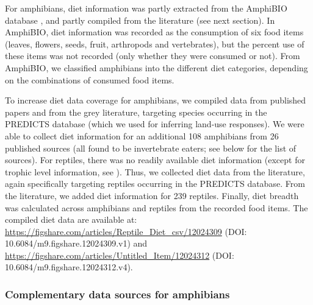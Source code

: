 \documentclass[11pt]{article}
\begin{document}
For amphibians, diet information was partly extracted from the AmphiBIO database \citep{Oliveira2017}, and partly compiled from the literature (see next section). In AmphiBIO, diet information was recorded as the consumption of six food items (leaves, flowers, seeds, fruit, arthropods and vertebrates), but the percent use of these items was not recorded (only whether they were consumed or not). From AmphiBIO, we classified amphibians into the different diet categories, depending on the combinations of consumed food items. 

To increase diet data coverage for amphibians, we compiled data from published papers and from the grey literature, targeting species occurring in the PREDICTS database (which we used for inferring land-use responses). We were able to collect diet information for an additional 108 amphibians from 26 published sources (all found to be invertebrate eaters; see below for the list of sources). For reptiles, there was no readily available diet information (except for trophic level information, see \citet{Etard2020}). Thus, we collected diet data from the literature, again specifically targeting reptiles occurring in the PREDICTS database. From the literature, we added diet information for 239 reptiles. Finally, diet breadth was calculated across amphibians and reptiles from the recorded food items. The compiled diet data are available at:
\url{https://figshare.com/articles/Reptile_Diet_csv/12024309} (DOI: 10.6084/m9.figshare.12024309.v1) and
\url{https://figshare.com/articles/Untitled_Item/12024312} (DOI: 10.6084/m9.figshare.12024312.v4).

\subsubsection*{Complementary data sources for amphibians}
\end{document}

